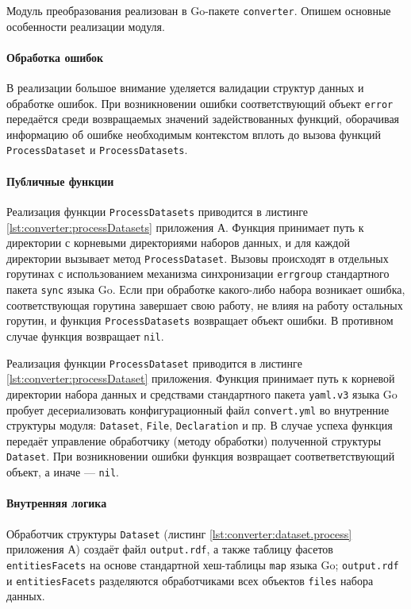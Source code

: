 Модуль преобразования реализован в Go-пакете \texttt{converter}. Опишем основные особенности реализации модуля.

\paragraph{Обработка ошибок}

В реализации большое внимание уделяется валидации структур данных и обработке ошибок. При возникновении ошибки
соответствующий объект \texttt{error} передаётся среди возвращаемых значений задействованных функций, оборачивая
информацию об ошибке необходимым контекстом вплоть до вызова функций \texttt{ProcessDataset} и \texttt{ProcessDatasets}.

\paragraph{Публичные функции}

Реализация функции \texttt{ProcessDatasets} приводится в листинге \ref{lst:converter:processDatasets} приложения А.
Функция принимает путь к директории с корневыми директориями наборов данных, и для каждой директории вызывает метод
\texttt{ProcessDataset}. Вызовы происходят в отдельных горутинах с использованием механизма синхронизации
\texttt{errgroup} стандартного пакета \texttt{sync} языка Go. Если при обработке какого-либо набора возникает ошибка,
соответствующая горутина завершает свою работу, не влияя на работу остальных горутин, и функция \texttt{ProcessDatasets}
возвращает объект ошибки. В противном случае функция возвращает \texttt{nil}.

Реализация функции \texttt{ProcessDataset} приводится в листинге \ref{lst:converter:processDataset} приложения.
Функция принимает путь к корневой директории набора данных и средствами стандартного пакета \texttt{yaml.v3} языка Go
пробует десериализовать конфигурационный файл \texttt{convert.yml} во внутренние структуры модуля: \texttt{Dataset},
\texttt{File}, \texttt{Declaration} и пр. В случае успеха функция передаёт управление обработчику (методу обработки)
полученной структуры \texttt{Dataset}. При возникновении ошибки функция возвращает соответветствующий объект, а
иначе --- \texttt{nil}.

\paragraph{Внутренняя логика}

Обработчик структуры \texttt{Dataset} (листинг \ref{lst:converter:dataset.process} приложения А) создаёт файл
\texttt{output.rdf}, а также таблицу фасетов \texttt{entitiesFacets} на основе стандартной хеш-таблицы \texttt{map}
языка Go; \texttt{output.rdf} и \texttt{entitiesFacets} разделяются обработчиками всех объектов \texttt{files} набора
данных.

